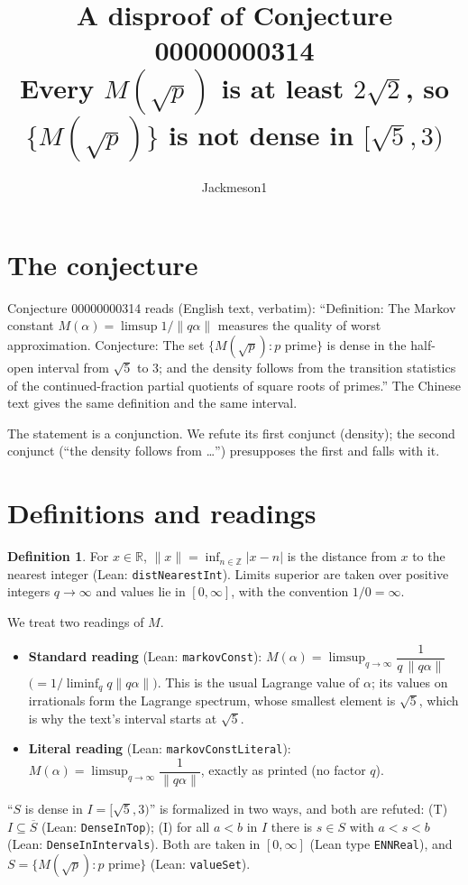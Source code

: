 \documentclass[11pt]{article}
\title{A disproof of Conjecture 00000000314\\[2pt]
\large Every $M(\sqrt p)$ is at least $2\sqrt 2$, so $\{M(\sqrt p)\}$ is not dense in $[\sqrt5,3)$}
\author{Jackmeson1}
\date{}
\renewcommand{\_}{\oldus\allowbreak}
\theoremstyle{definition}
\newtheorem{definition}[theorem]{Definition}
\theoremstyle{remark}
\begin{document}
\maketitle

\section{The conjecture}
Conjecture 00000000314 reads (English text, verbatim): ``Definition: The Markov constant
$M(\alpha) = \limsup 1/\|q\alpha\|$ measures the quality of worst approximation. Conjecture: The set
$\{M(\sqrt p) : p \text{ prime}\}$ is dense in the half-open interval from $\sqrt5$ to $3$; and the
density follows from the transition statistics of the continued-fraction partial quotients of square
roots of primes.'' The Chinese text gives the same definition and the same interval.

The statement is a conjunction. We refute its first conjunct (density); the second conjunct
(``the density follows from \dots'') presupposes the first and falls with it.

\section{Definitions and readings}
\begin{definition}
For $x\in\mathbb R$, $\|x\| = \inf_{n\in\mathbb Z}|x-n|$ is the distance from $x$ to the nearest
integer (Lean: \texttt{distNearestInt}). Limits superior are taken over positive integers
$q\to\infty$ and values lie in $[0,\infty]$, with the convention $1/0=\infty$.
\end{definition}
We treat two readings of $M$.
\begin{itemize}
\item \textbf{Standard reading} (Lean: \texttt{markovConst}):
  $M(\alpha) = \limsup_{q\to\infty} \dfrac{1}{q\,\|q\alpha\|}$ $\bigl(= 1/\liminf_q q\|q\alpha\|\bigr)$.
  This is the usual Lagrange value of $\alpha$; its values on irrationals form the Lagrange spectrum,
  whose smallest element is $\sqrt5$, which is why the text's interval starts at $\sqrt5$.
\item \textbf{Literal reading} (Lean: \texttt{markovConstLiteral}):
  $M(\alpha) = \limsup_{q\to\infty} \dfrac{1}{\|q\alpha\|}$, exactly as printed (no factor $q$).
\end{itemize}
``$S$ is dense in $I=[\sqrt5,3)$'' is formalized in two ways, and both are refuted:
(T) $I\subseteq\overline S$ (Lean: \texttt{DenseInTop}); (I) for all $a<b$ in $I$ there is
$s\in S$ with $a<s<b$ (Lean: \texttt{DenseInIntervals}). Both are taken in $[0,\infty]$
(Lean type \texttt{ENNReal}), and $S=\{M(\sqrt p): p\text{ prime}\}$ (Lean: \texttt{valueSet}).
\end{document}
